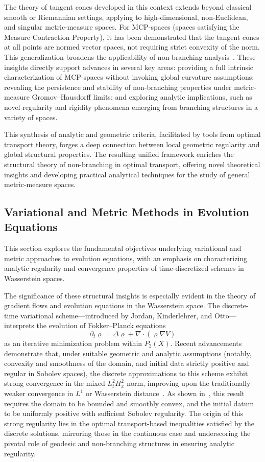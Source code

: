 \documentclass[sigconf]{acmart}
\begin{document}
The theory of tangent cones developed in this context extends beyond classical smooth or Riemannian settings, applying to high-dimensional, non-Euclidean, and singular metric-measure spaces. For MCP-spaces (spaces satisfying the Measure Contraction Property), it has been demonstrated that the tangent cones at all points are normed vector spaces, not requiring strict convexity of the norm. This generalization broadens the applicability of non-branching analysis~\cite{ref107}. These insights directly support advances in several key areas: providing a full intrinsic characterization of MCP-spaces without invoking global curvature assumptions; revealing the persistence and stability of non-branching properties under metric-measure Gromov--Hausdorff limits; and exploring analytic implications, such as novel regularity and rigidity phenomena emerging from branching structures in a variety of spaces.

This synthesis of analytic and geometric criteria, facilitated by tools from optimal transport theory, forges a deep connection between local geometric regularity and global structural properties. The resulting unified framework enriches the structural theory of non-branching in optimal transport, offering novel theoretical insights and developing practical analytical techniques for the study of general metric-measure spaces.

\subsection{Variational and Metric Methods in Evolution Equations}

This section explores the fundamental objectives underlying variational and metric approaches to evolution equations, with an emphasis on characterizing analytic regularity and convergence properties of time-discretized schemes in Wasserstein spaces.

The significance of these structural insights is especially evident in the theory of gradient flows and evolution equations in the Wasserstein space. The discrete-time variational scheme—introduced by Jordan, Kinderlehrer, and Otto—interprets the evolution of Fokker--Planck equations
\[
\partial_t \varrho = \Delta \varrho + \nabla\cdot(\varrho \nabla V)
\]
as an iterative minimization problem within $P_2(X)$. Recent advancements demonstrate that, under suitable geometric and analytic assumptions (notably, convexity and smoothness of the domain, and initial data strictly positive and regular in Sobolev spaces), the discrete approximations to this scheme exhibit strong convergence in the mixed $L^2_t H^2_x$ norm, improving upon the traditionally weaker convergence in $L^1$ or Wasserstein distance~\cite{ref96}. As shown in~\cite{ref96}, this result requires the domain to be bounded and smoothly convex, and the initial datum to be uniformly positive with sufficient Sobolev regularity. The origin of this strong regularity lies in the optimal transport-based inequalities satisfied by the discrete solutions, mirroring those in the continuous case and underscoring the pivotal role of geodesic and non-branching structures in ensuring analytic regularity.
\end{document}
